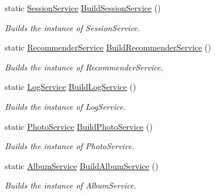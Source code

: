 \begin{DoxyCompactItemize}
static \hyperlink{classcom_1_1shephertz_1_1app42_1_1paas_1_1sdk_1_1csharp_1_1session_1_1_session_service}{Session\+Service} \hyperlink{classcom_1_1shephertz_1_1app42_1_1paas_1_1sdk_1_1csharp_1_1_app42_a_p_i_ac455c8d8309da05f8fc676897d65df3e}{Build\+Session\+Service} ()
\begin{DoxyCompactList}\small\item\em Builds the instance of Session\+Service. \end{DoxyCompactList}\item 
static \hyperlink{classcom_1_1shephertz_1_1app42_1_1paas_1_1sdk_1_1csharp_1_1recommend_1_1_recommender_service}{Recommender\+Service} \hyperlink{classcom_1_1shephertz_1_1app42_1_1paas_1_1sdk_1_1csharp_1_1_app42_a_p_i_ab833b5205e804c06feb2dd2a4a465e35}{Build\+Recommender\+Service} ()
\begin{DoxyCompactList}\small\item\em Builds the instance of Recommender\+Service. \end{DoxyCompactList}\item 
static \hyperlink{classcom_1_1shephertz_1_1app42_1_1paas_1_1sdk_1_1csharp_1_1log_1_1_log_service}{Log\+Service} \hyperlink{classcom_1_1shephertz_1_1app42_1_1paas_1_1sdk_1_1csharp_1_1_app42_a_p_i_ab02e922b40ee20e8edf96a3d3b66c6da}{Build\+Log\+Service} ()
\begin{DoxyCompactList}\small\item\em Builds the instance of Log\+Service. \end{DoxyCompactList}\item 
static \hyperlink{classcom_1_1shephertz_1_1app42_1_1paas_1_1sdk_1_1csharp_1_1gallery_1_1_photo_service}{Photo\+Service} \hyperlink{classcom_1_1shephertz_1_1app42_1_1paas_1_1sdk_1_1csharp_1_1_app42_a_p_i_ab2f27828e564b1a16441e5d1736d7b20}{Build\+Photo\+Service} ()
\begin{DoxyCompactList}\small\item\em Builds the instance of Photo\+Service. \end{DoxyCompactList}\item 
static \hyperlink{classcom_1_1shephertz_1_1app42_1_1paas_1_1sdk_1_1csharp_1_1gallery_1_1_album_service}{Album\+Service} \hyperlink{classcom_1_1shephertz_1_1app42_1_1paas_1_1sdk_1_1csharp_1_1_app42_a_p_i_a2f4cd916bd00514b5dd989ddbbca5657}{Build\+Album\+Service} ()
\begin{DoxyCompactList}\small\item\em Builds the instance of Album\+Service. \end{DoxyCompactList}\item 

\end{DoxyCompactItemize}

